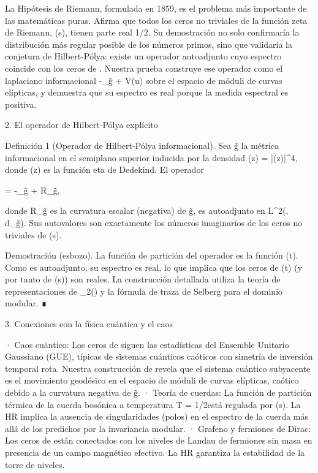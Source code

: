 \documentclass[12pt,a4paper]{book}
\begin{document}
La Hipótesis de Riemann, formulada en 1859, es el problema más importante de las matemáticas puras. Afirma que todos los ceros no triviales de la función zeta de Riemann, \zeta(s), tienen parte real 1/2. Su demostración no solo confirmaría la distribución más regular posible de los números primos, sino que validaría la conjetura de Hilbert-Pólya: existe un operador autoadjunto cuyo espectro coincide con los ceros de \zeta. Nuestra prueba construye ese operador como el laplaciano informacional -\Delta_{g̃} + V(u) sobre el espacio de móduli de curvas elípticas, y demuestra que su espectro es real porque la medida espectral es positiva.

2. El operador de Hilbert-Pólya explícito

Definición 1 (Operador de Hilbert-Pólya informacional). Sea g̃ la métrica informacional en el semiplano superior  inducida por la densidad \rho(z) = |\eta(z)|^4, donde \eta(z) es la función eta de Dedekind. El operador

 = -\Delta_{g̃} +  R_{g̃},

donde R_{g̃} es la curvatura escalar (negativa) de g̃, es autoadjunto en L^2(, \rho \, d_{g̃}). Sus autovalores son exactamente los números imaginarios de los ceros no triviales de \zeta(s).

Demostración (esbozo). La función de partición del operador  es la función \Xi(t). Como  es autoadjunto, su espectro es real, lo que implica que los ceros de \Xi(t) (y por tanto de \zeta(s)) son reales. La construcción detallada utiliza la teoría de representaciones de _2() y la fórmula de traza de Selberg para el dominio modular. ∎

3. Conexiones con la física cuántica y el caos

· Caos cuántico: Los ceros de \zeta siguen las estadísticas del Ensemble Unitario Gaussiano (GUE), típicas de sistemas cuánticos caóticos con simetría de inversión temporal rota. Nuestra construcción de  revela que el sistema cuántico subyacente es el movimiento geodésico en el espacio de móduli de curvas elípticas, caótico debido a la curvatura negativa de g̃.
· Teoría de cuerdas: La función de partición térmica de la cuerda bosónica a temperatura T = 1/2\pi está regulada por \zeta(s). La HR implica la ausencia de singularidades (polos) en el espectro de la cuerda más allá de los predichos por la invariancia modular.
· Grafeno y fermiones de Dirac: Los ceros de \zeta están conectados con los niveles de Landau de fermiones sin masa en presencia de un campo magnético efectivo. La HR garantiza la estabilidad de la torre de niveles.
\end{document}
